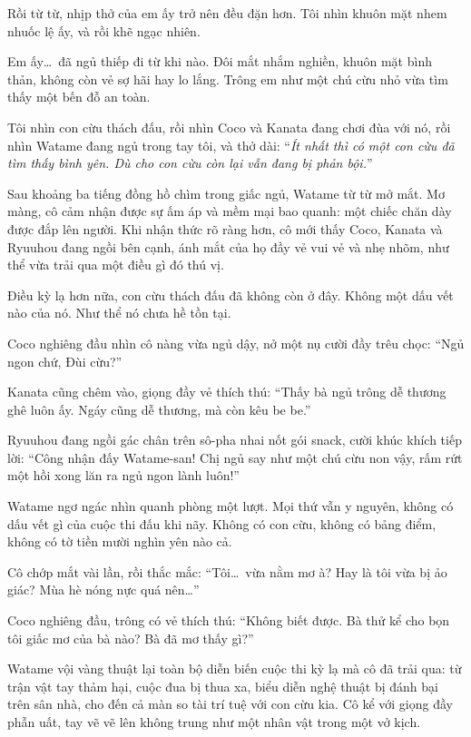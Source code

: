 \documentclass[../main.tex]{subfiles}
\begin{document}
Rồi từ từ, nhịp thở của em ấy trở nên đều đặn hơn. Tôi nhìn khuôn mặt nhem nhuốc lệ ấy, và rồi khẽ ngạc nhiên.

Em ấy\dots\ đã ngủ thiếp đi từ khi nào. Đôi mắt nhắm nghiền, khuôn mặt bình thản, không còn vẻ sợ hãi hay lo lắng. Trông em như một chú cừu nhỏ vừa tìm thấy một bến đỗ an toàn.

Tôi nhìn con cừu thách đấu, rồi nhìn Coco và Kanata đang chơi đùa với nó, rồi nhìn Watame đang ngủ trong tay tôi, và thở dài: ``\textit{Ít nhất thì có một con cừu đã tìm thấy bình yên. Dù cho con cừu còn lại vẫn đang bị phản bội.}''

\omk

Sau khoảng ba tiếng đồng hồ chìm trong giấc ngủ, Watame từ từ mở mắt. Mơ màng, cô cảm nhận được sự ấm áp và mềm mại bao quanh: một chiếc chăn dày được đắp lên người. Khi nhận thức rõ ràng hơn, cô mới thấy Coco, Kanata và Ryuuhou đang ngồi bên cạnh, ánh mắt của họ đầy vẻ vui vẻ và nhẹ nhõm, như thể vừa trải qua một điều gì đó thú vị.

Điều kỳ lạ hơn nữa, con cừu thách đấu đã không còn ở đây. Không một dấu vết nào của nó. Như thể nó chưa hề tồn tại.

Coco nghiêng đầu nhìn cô nàng vừa ngủ dậy, nở một nụ cười đầy trêu chọc: ``Ngủ ngon chứ, Đùi cừu?''

Kanata cũng chêm vào, giọng đầy vẻ thích thú: ``Thấy bà ngủ trông dễ thương ghê luôn ấy. Ngáy cũng dễ thương, mà còn kêu be be.''

Ryuuhou đang ngồi gác chân trên sô-pha nhai nốt gói snack, cười khúc khích tiếp lời: ``Công nhận đấy Watame-san! Chị ngủ say như một chú cừu non vậy, rấm rứt một hồi xong lăn ra ngủ ngon lành luôn!''

Watame ngơ ngác nhìn quanh phòng một lượt. Mọi thứ vẫn y nguyên, không có dấu vết gì của cuộc thi đấu khi nãy. Không có con cừu, không có bảng điểm, không có tờ tiền mười nghìn yên nào cả.

Cô chớp mắt vài lần, rồi thắc mắc: ``Tôi\dots\ vừa nằm mơ à? Hay là tôi vừa bị ảo giác? Mùa hè nóng nực quá nên\dots''

Coco nghiêng đầu, trông có vẻ thích thú: ``Không biết được. Bà thử kể cho bọn tôi giấc mơ của bà nào? Bà đã mơ thấy gì?''

Watame vội vàng thuật lại toàn bộ diễn biến cuộc thi kỳ lạ mà cô đã trải qua: từ trận vật tay thảm hại, cuộc đua bị thua xa, biểu diễn nghệ thuật bị đánh bại trên sân nhà, cho đến cả màn so tài trí tuệ với con cừu kia. Cô kể với giọng đầy phẫn uất, tay vẽ vẽ lên không trung như một nhân vật trong một vở kịch.
\end{document}
